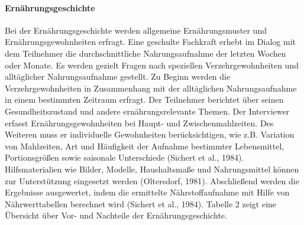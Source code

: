 \paragraph{Ernährungsgeschichte}
Bei der Ernährungsgeschichte werden allgemeine Ernährungsmuster und Ernährungsgewohnheiten erfragt. Eine geschulte Fachkraft erhebt im Dialog mit dem Teilnehmer die durchschnittliche Nahrungsaufnahme der letzten Wochen oder Monate. Es werden gezielt Fragen nach speziellen Verzehrgewohnheiten und alltäglicher Nahrungsaufnahme gestellt. Zu Beginn werden die Verzehrgewohnheiten in Zusammenhang mit der alltäglichen Nahrungsaufnahme in einem bestimmten Zeitraum erfragt. Der Teilnehmer berichtet über  seinen Gesundheitszustand und andere ernährungsrelevante Themen. Der Interviewer erfasst Ernährungsgewohnheiten bei Haupt- und Zwischenmahlzeiten. Des Weiteren muss er individuelle Gewohnheiten berücksichtigen, wie z.B. Variation von Mahlzeiten, Art und Häufigkeit der Aufnahme bestimmter Lebensmittel, Portionsgrößen sowie saisonale Unterschiede (Sichert et al., 1984). Hilfsmaterialien wie Bilder, Modelle, Haushaltsmaße und Nahrungsmittel können zur Unterstützung eingesetzt werden (Oltersdorf, 1981). Abschließend werden die Ergebnisse ausgewertet, indem die ermittelte Nährstoffaufnahme mit Hilfe von Nährwerttabellen berechnet wird (Sichert et al., 1984). 
Tabelle 2 zeigt eine Übersicht über Vor- und Nachteile der Ernährungsgeschichte.



